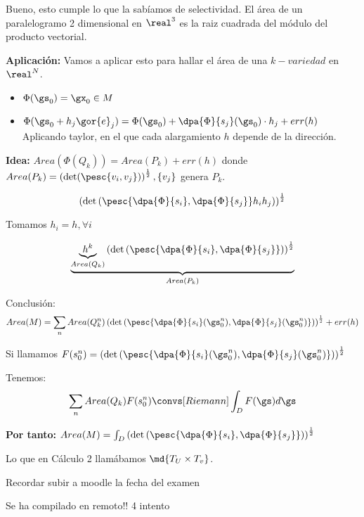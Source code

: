 Bueno, esto cumple lo que la sabíamos de selectividad. El área de un paralelogramo 2 dimensional en $\real^3$ es la raiz cuadrada del módulo del producto vectorial.

\textbf{Aplicación:} Vamos a aplicar esto para hallar el área de una $k-variedad$ en $\real^N$.

\begin{itemize}
\item $\Phi(\gs_0) = \gx_0 \in M$
\item $\Phi(\gs_0 + h_j\gor{e}_j) = \Phi(\gs_0) + \dpa{\Phi}{s_j}(\gs_0)\cdot h_j + err(h)$
Aplicando taylor, en el que cada alargamiento $h$ depende de la dirección.
\end{itemize}

\textbf{Idea:} $Area(\Phi(Q_k)) = Area(P_k) + err(h)$ donde $Area(P_k) = \left(\det (\pesc{v_i,v_j})\right)^{\frac{1}{2}}, \{v_j\}$ genera $P_k$.


\[\left(\det\left(\pesc{\dpa{\Phi}{s_i},\dpa{\Phi}{s_j}}h_ih_j\right)\right)^{\frac{1}{2}}\]

Tomamos $h_i = h, \forall i$

\[\underbrace{\underbrace{h^k}_{Area(Q_k)} \left(\det\left(\pesc{\dpa{\Phi}{s_i},\dpa{\Phi}{s_j}}\right)\right)^{\frac{1}{2}}}_{Area(P_k)}\]

Conclusión: \[Area(M) = \sum_n Area(Q_k^n) \left(\det\left(\pesc{\dpa{\Phi}{s_i}(\gs_0^n),\dpa{\Phi}{s_j}(\gs_0^n)}\right)\right)^{\frac{1}{2}} + err(h)\]

Si llamamos $F(s_0^n) = \left(\det\left(\pesc{\dpa{\Phi}{s_i}(\gs_0^n),\dpa{\Phi}{s_j}(\gs_0^n)}\right)\right)^{\frac{1}{2}}$ 

Tenemos: \[\sum_n Area(Q_k) F(s_0^n) \convs[Riemann] \int_D F(\gs)d\gs\]

\textbf{Por tanto:} $Area(M) = \int_D \left(\det\left(\pesc{\dpa{\Phi}{s_i},\dpa{\Phi}{s_j}}\right)\right)^{\frac{1}{2}}$

Lo que en Cálculo 2 llamábamos $\md{T_U\times T_v}$.

Recordar subir a moodle la fecha del examen


Se ha compilado en remoto!! 4 intento
